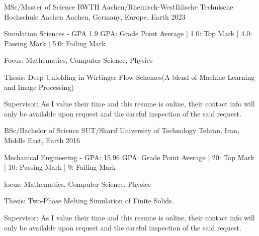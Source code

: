 

\begin{cventries}

  \cventry
    {MSc/Master of Science} %
    {RWTH Aachen/Rheinisch-Westfälische Technische Hochschule Aachen} %
    {Aachen, Germany, Europe, Earth} %
    {2023} %
    {
      \begin{cvitems} %
        \item {Simulation Sciences - GPA 1.9} \hfill {GPA: Grade Point Average | 1.0: Top Mark | 4.0: Passing Mark | 5.0: Failing Mark}
        \item {Focus: Mathematics, Computer Science, Physics}
        \item {Thesis: Deep Unfolding in Wirtinger Flow Schemes(A blend of Machine Learning and Image Processing)}
        \item {Supervisor: As I value their time and this resume is online, their contact info will only be available upon request and the careful inspection of the said request.}
      \end{cvitems}
    }
    
  \cventry
    {BSc/Bachelor of Science} %
    {SUT/Sharif University of Technology} %
    {Tehran, Iran, Middle East, Earth} %
    {2016} %
    {
      \begin{cvitems} %
        \item {Mechanical Engineering - GPA: 15.96} \hfill {GPA: Grade Point Average | 20: Top Mark | 10: Passing Mark | 9: Failing Mark}
        \item {focus: Mathematics, Computer Science, Physics} 
        \item {Thesis: Two-Phase Melting Simulation of Finite Solids}
        \item {Supervisor: As I value their time and this resume is online, their contact info will only be available upon request and the careful inspection of the said request.}
      \end{cvitems}
    }

\end{cventries}
